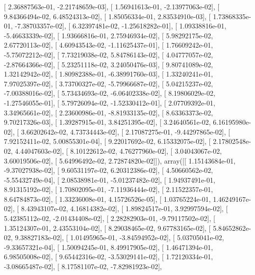 \documentclass{article}
\begin{document}
       [  2.36887563e-01,  -2.21748659e-03],
       [  1.56941613e-01,  -2.13977063e-02],
       [  9.84366494e-02,   6.48524313e-02],
       [  1.85056334e-01,   2.83534910e-03],
       [  1.73868335e-01,  -7.38703357e-02],
       [  6.32397481e-02,  -1.25618282e-01],
       [  1.09338816e-01,  -5.46633339e-02],
       [  1.93666816e-01,   2.75946934e-02],
       [  5.98292175e-02,   2.67720113e-02],
       [  4.60943543e-02,  -1.11625437e-01],
       [  1.76609242e-01,  -5.75072212e-02],
       [  7.73219038e-02,   5.84786143e-02],
       [  4.04777057e-02,  -2.87664366e-02],
       [  5.23251118e-02,   3.24050476e-03],
       [  9.80741089e-02,   1.32142942e-02],
       [  1.80982388e-01,  -6.38991760e-03],
       [  1.33240241e-01,   7.97025397e-02],
       [  3.73700327e-02,  -5.79966687e-02],
       [  5.04215237e-02,  -7.00388016e-02],
       [  5.73434693e-02,  -6.06402338e-02],
       [  8.19806029e-02,  -1.27546055e-01],
       [  5.79726094e-02,  -1.52330412e-01],
       [  2.07709392e-01,   3.34965661e-02],
       [  2.23600986e-01,  -8.81933135e-02],
       [  8.63363373e-02,   9.70217326e-03],
       [  1.39287915e-01,   3.84251395e-02],
       [  3.24640561e-02,   6.16195980e-02],
       [  3.66202642e-02,   4.73734443e-02],
       [  2.17087275e-01,  -9.44297865e-02],
       [  7.92152411e-02,   5.00855301e-04],
       [  9.22017692e-02,   6.15332075e-02],
       [  2.17802548e-02,   4.44047603e-02],
       [  8.10122612e-02,   4.76277960e-02],
       [  3.04043067e-02,   3.60019506e-02],
       [  5.64996492e-02,   2.72874820e-02]]), array([[  1.15143684e-01,  -9.37027938e-02],
       [  9.60531197e-02,   6.20312386e-02],
       [  4.50660562e-02,  -5.55432749e-04],
       [  2.08538981e-01,  -5.01237482e-02],
       [  1.94937491e-01,   8.91315192e-02],
       [  1.70802095e-01,  -7.11936444e-02],
       [  2.11522357e-01,   8.64784873e-02],
       [  1.33236008e-01,   4.15726526e-05],
       [  1.03765224e-01,   1.46249167e-02],
       [  8.43943107e-02,   4.16814382e-02],
       [  1.89824517e-01,   3.92997594e-02],
       [  5.42385112e-02,  -2.01434408e-02],
       [  2.28282903e-01,  -9.79117502e-02],
       [  1.35124307e-01,   2.43553104e-02],
       [  8.29038465e-02,   9.67783165e-02],
       [  5.84652862e-02,   9.38827183e-02],
       [  1.01495965e-01,  -3.84594952e-02],
       [  5.03705041e-02,  -9.33657321e-04],
       [  1.50094245e-01,   8.49917905e-02],
       [  1.46471394e-01,   6.98505008e-02],
       [  9.65442316e-02,  -3.53029141e-02],
       [  1.72120334e-01,  -3.08665487e-02],
       [  8.17581107e-02,  -7.82981923e-02],
\end{document}
